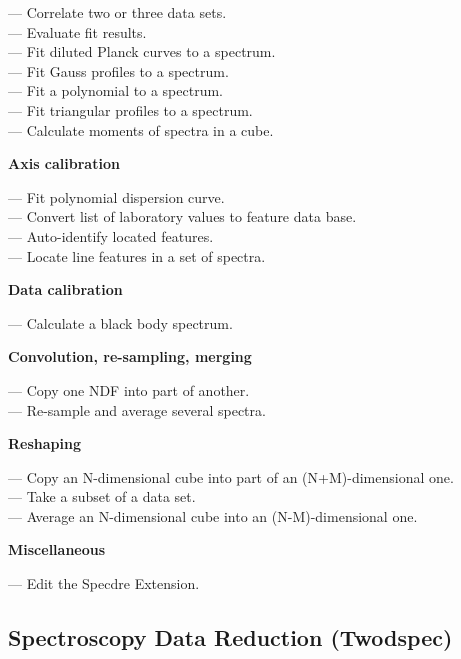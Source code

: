  --- Correlate two or three data sets.\\
 --- Evaluate fit results.\\
 --- Fit diluted Planck curves to a spectrum.\\
 --- Fit Gauss profiles to a spectrum.\\
 --- Fit a polynomial to a spectrum.\\
 --- Fit triangular profiles to a spectrum.\\
 --- Calculate moments of spectra in a cube.

{\bf Axis calibration}

 --- Fit polynomial dispersion curve.\\
 --- Convert list of laboratory values to feature data base.\\
 --- Auto-identify located features.\\
 --- Locate line features in a set of spectra.

{\bf Data calibration}

 --- Calculate a black body spectrum.

{\bf Convolution, re-sampling, merging}

 --- Copy one NDF into part of another.\\
 --- Re-sample and average several spectra.

{\bf Reshaping}

 --- Copy an N-dimensional cube into part of an (N+M)-dimensional one.\\
 --- Take a subset of a data set.\\
 --- Average an N-dimensional cube into an (N-M)-dimensional one.

{\bf Miscellaneous}

 --- Edit the Specdre Extension.\\


\subsection{\label{classiftwodspec}Spectroscopy Data Reduction (Twodspec)}

